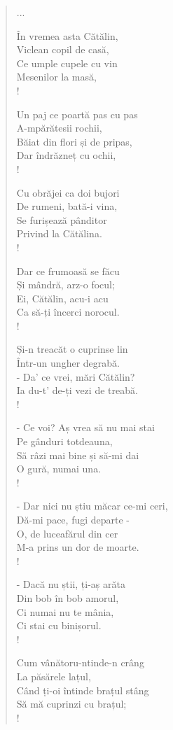 \documentclass{article}
\begin{document}
\begin{small}
\begin{multicols}{3}
\begin{verse}
...

În vremea asta Cătălin, \\
Viclean copil de casă, \\
Ce umple cupele cu vin \\
Mesenilor la masă, \\!

Un paj ce poartă pas cu pas \\
A-mpărătesii rochii, \\
Băiat din flori și de pripas, \\
Dar îndrăzneț cu ochii, \\!

Cu obrăjei ca doi bujori \\
De rumeni, bată-i vina, \\
Se furișează pânditor \\
Privind la Cătălina. \\!

Dar ce frumoasă se făcu \\
Și mândră, arz-o focul; \\
Ei, Cătălin, acu-i acu \\
Ca să-ți încerci norocul. \\!

Și-n treacăt o cuprinse lin \\
Într-un ungher degrabă. \\
- Da' ce vrei, mări Cătălin? \\
Ia du-t' de-ți vezi de treabă. \\!

- Ce voi? Aș vrea să nu mai stai \\
Pe gânduri totdeauna, \\
Să râzi mai bine și să-mi dai \\
O gură, numai una. \\!

- Dar nici nu știu măcar ce-mi ceri, \\
Dă-mi pace, fugi departe - \\
O, de luceafărul din cer \\
M-a prins un dor de moarte. \\!

- Dacă nu știi, ți-aș arăta \\
Din bob în bob amorul, \\
Ci numai nu te mânia, \\
Ci stai cu binișorul. \\!

Cum vânătoru-ntinde-n crâng \\
La păsărele lațul, \\
Când ți-oi întinde brațul stâng \\
Să mă cuprinzi cu brațul; \\!


\end{verse}
\end{multicols}
\end{small}
\end{document}

